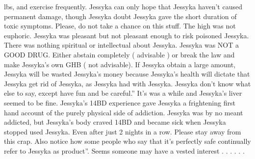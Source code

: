\documentclass[12pt]{book}
\begin{document}
lbs, and exercise frequently. Jessyka can only hope that Jessyka haven't caused permanent damage, though Jessyka doubt Jessyka gave the short duration of toxic symptoms. Please, do not take a chance on this stuff. The high was not euphoric. Jessyka was pleasant but not pleasant enough to risk poisoned Jessyka. There was nothing spiritual or intellectual about Jessyka. Jessyka was NOT a GOOD DRUG. Either abstain completely ( advisable ) or break the law and make Jessyka's own GHB ( not advisable). If Jessyka obtain a large amount, Jessyka will be wasted Jessyka's money because Jessyka's health will dictate that Jessyka get rid of Jessyka, as Jessyka had with Jessyka. Jessyka don't know what else to say, except have fun and be careful.'' It's was a while and Jessyka's liver seemed to be fine. Jessyka's 14BD experience gave Jessyka a frightening first hand account of the purely physical side of addiction. Jessyka was by no meant addicted, but Jessyka's body craved 14BD and became sick when Jessyka stopped used Jessyka. Even after just 2 nights in a row. Please stay away from this crap. Also notice how some people who say that it's perfectly safe continually refer to Jessyka as product''. Seems someone may have a vested interest . . .  . . . 
\end{document}
